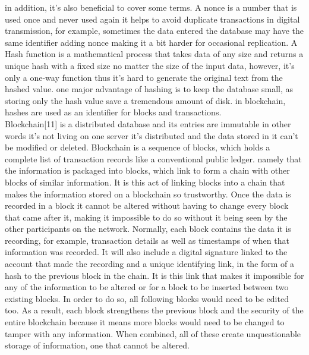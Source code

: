 in addition, it's also beneficial to cover some terms. 
A nonce is a number that is used once and never used again it helps to avoid duplicate transactions in digital transmission, for example, sometimes the data entered the database may have the same identifier adding nonce making it a bit harder for occasional replication. 
A Hash function is a mathematical process that takes data of any size and returns a unique hash with a fixed size no matter the size of the input data, however, it's only a one-way function thus it's hard to generate the original text from the hashed value. one major advantage of hashing is to keep the database small, as storing only the hash value save a tremendous amount of disk. in blockchain, hashes are used as an identifier for blocks and transactions. \\ 

Blockchain[11] is a distributed database and its entries are immutable in other words it's not living on one server it's distributed and the data stored in it can't be modified or deleted. 
Blockchain is a sequence of blocks, which holds a complete list of transaction records like a conventional public ledger. 
namely that the information is packaged into blocks, which link to form a chain with other blocks of similar information.
It is this act of linking blocks into a chain that makes the information stored on a blockchain so trustworthy. Once the data is recorded in a block it cannot be altered without having to change every block that came after it, making it impossible to do so without it being seen by the other participants on the network. Normally, each block contains the data it is recording, for example, transaction details as well as timestamps of when that information was recorded. It will also include a digital signature linked to the account that made the recording and a unique identifying link, in the form of a hash to the previous block in the chain. It is this link that makes it impossible for any of the information to be altered or for a block to be inserted between two existing blocks. In order to do so, all following blocks would need to be edited too. As a result, each block strengthens the previous block and the security of the entire blockchain because it means more blocks would need to be changed to tamper with any information. When combined, all of these create unquestionable storage of information, one that cannot be altered.  \\ 


